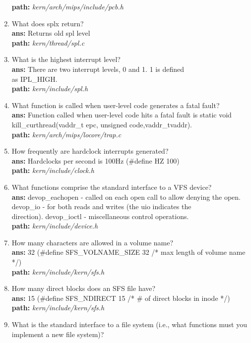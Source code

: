 \documentclass[14pt, a4paper]{article}
\begin{document}
\begin{enumerate}
          \textbf{path:} \emph{kern/arch/mips/include/pcb.h}
    \item What does splx return?\\
          \textbf{ans: } Returns old spl level\\
          \textbf{path:} \emph{kern/thread/spl.c}
    \item What is the highest interrupt level?\\
          \textbf{ans: } There are two interrupt levels, 0 and 1. 1 is defined\\ as IPL\_HIGH.\\
          \textbf{path:} \emph{ kern/include/spl.h}
    \item What function is called when user-level code generates a fatal fault?\\
          \textbf{ans: } Function called when user-level code hits a fatal fault is static void kill\_curthread(vaddr\_t epc, unsigned code,vaddr\_tvaddr).\\
          \textbf{path:} \emph{kern/arch/mips/locore/trap.c}
    \item How frequently are hardclock interrupts generated?\\
          \textbf{ans: } Hardclocks per second is 100Hz (\#define HZ 100)\\
          \textbf{path:} \emph{kern/include/clock.h}
    \item What functions comprise the standard interface to a VFS device?\\
          \textbf{ans: } devop\_eachopen - called on each open call to allow denying the open. devop\_io - for both reads and writes (the uio indicates the\\ direction). devop\_ioctl - miscellaneous control operations.\\
          \textbf{path:} \emph{ kern/include/device.h}
    \item  How many characters are allowed in a volume name?\\
          \textbf{ans: } 32 (\#define SFS\_VOLNAME\_SIZE 32 /* max length of volume name */)\\
          \textbf{path:} \emph{kern/include/kern/sfs.h}
    \item  How many direct blocks does an SFS file have?\\
          \textbf{ans: } 15 (\#define SFS\_NDIRECT 15 /* \# of direct blocks in inode */)\\
          \textbf{path:} \emph{kern/include/kern/sfs.h}
    \item What is the standard interface to a file system (i.e., what functions must you implement a new file system)?\\

\end{enumerate}
\end{document}
